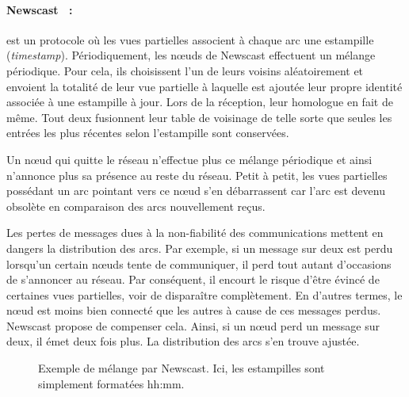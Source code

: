 \paragraph{Newscast~\cite{tolgyeski2009adaptive} :} est un protocole où les vues
partielles associent à chaque arc une estampille
(\emph{timestamp}). Périodiquement, les nœuds de Newscast effectuent un mélange
périodique. Pour cela, ils choisissent l'un de leurs voisins aléatoirement et
envoient la totalité de leur vue partielle à laquelle est ajoutée leur propre
identité associée à une estampille à jour. Lors de la réception, leur homologue
en fait de même. Tout deux fusionnent leur table de voisinage de telle sorte que
seules les entrées les plus récentes selon l'estampille sont conservées.

\noindent Un nœud qui quitte le réseau n'effectue plus ce mélange périodique et
ainsi n'annonce plus sa présence au reste du réseau. Petit à petit, les vues
partielles possédant un arc pointant vers ce nœud s'en débarrassent car l'arc
est devenu obsolète en comparaison des arcs nouvellement reçus.

\noindent Les pertes de messages dues à la non-fiabilité des communications
mettent en dangers la distribution des arcs. Par exemple, si un message sur deux
est perdu lorsqu'un certain nœuds tente de communiquer, il perd tout autant
d'occasions de s'annoncer au réseau. Par conséquent, il encourt le risque d'être
évincé de certaines vues partielles, voir de disparaître complètement. En
d'autres termes, le nœud est moins bien connecté que les autres à cause de ces
messages perdus. Newscast propose de compenser cela. Ainsi, si un nœud perd un
message sur deux, il émet deux fois plus. La distribution des arcs s'en trouve
ajustée.

\begin{figure}
  \centering
  \hspace{35pt}
  \caption[Exemple de mélange dans Newscast]
  {\label{net:fig:newscastexample} Exemple de mélange par Newscast. Ici, les
    estampilles sont simplement formatées hh:mm.}
\end{figure}

